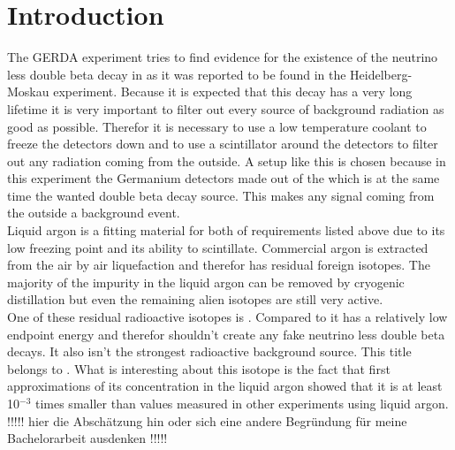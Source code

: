 





\section{Introduction}
\label{sec:intro}

The GERDA experiment tries to find evidence for the existence of the neutrino less double beta decay in  as it was reported to be found in the Heidelberg-Moskau experiment. 
Because it is expected that this decay has a very long lifetime it is very important to filter out every source of background radiation as good as possible. 
Therefor it is necessary to use a low temperature coolant to freeze the  detectors down and to use a scintillator around the detectors to filter out any radiation coming from the outside. 
A setup like this is chosen because in this experiment the Germanium detectors made out of the  which is at the same time the wanted double beta decay source. 
This makes any signal coming from the outside a background event. 
\\

Liquid argon is a fitting material for both of requirements listed above due to its low freezing point and its ability to scintillate. 
Commercial argon is extracted from the air by air liquefaction and therefor has residual foreign isotopes. 
The majority of the impurity in the liquid argon can be removed by cryogenic distillation but even the remaining alien isotopes are still very active.\\

One of these residual radioactive isotopes is . 
Compared to  it has a relatively low endpoint energy and therefor shouldn't create any fake neutrino less double beta decays. 
It also isn't the strongest radioactive background source. 
This title belongs to . 
What is interesting about this isotope is the fact that first approximations of its concentration in the liquid argon showed that it is at least 10\(^{-3}\) times smaller than values measured in other experiments using liquid argon. !!!!! hier die Abschätzung hin oder sich eine andere Begründung für meine Bachelorarbeit ausdenken !!!!!
\\

